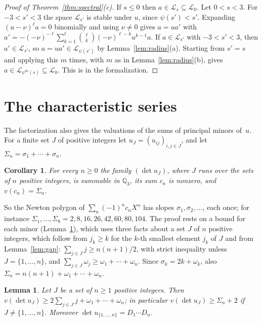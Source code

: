 \documentclass[11pt]{amsart}
\newtheorem{lemma}[theorem]{Lemma}
\newtheorem{corollary}[theorem]{Corollary}
\theoremstyle{definition}
\numberwithin{equation}{section}
\newcommand{\lean}[1]{\ignorespaces}
\newcommand{\Qp}{\mathbb{Q}_3}
\newcommand{\cL}{\mathcal{L}}
\newcommand{\Lc}{\mathcal{L}_0}
\newcommand{\sig}{\sigma}
\begin{document}
\begin{proof}[Proof of Theorem~\textup{\ref{thm:spectral}(c)}]
If $s\le0$ then $a\in\cL_s\subseteq\Lc$. Let $0<s<3$. For $-3<s'<3$ the space $\cL_{s'}$ is stable under $u$, since $\psi(s')<s'$. Expanding $(u-\nu)^\ell a=0$ binomially and using $\nu\ne0$ gives $a=ua'$ with $a'=-(-\nu)^{-\ell}\sum_{k=1}^{\ell}\binom{\ell}{k}(-\nu)^{\ell-k}u^{k-1}a$. If $a\in\cL_{s'}$ with $-3<s'<3$, then $a'\in\cL_{s'}$, so $a=ua'\in\cL_{\psi(s')}$ by Lemma~\ref{lem:radius}(a). Starting from $s'=s$ and applying this $m$ times, with $m$ as in Lemma~\ref{lem:radius}(b), gives $a\in\cL_{\psi^m(s)}\subseteq\Lc$. This is  in the formalization.
\end{proof}

\section{The characteristic series}\label{sec:fredholm}

The factorization also gives the valuations of the sums of principal minors of~$u$. For a finite set $J$ of positive integers let $u_J=(u_{ij})_{i,j\in J}$, and let $\Sigma_n=\sig_1+\cdots+\sig_n$.

\begin{corollary}\label{cor:fredholm}\lean{CalegariSlopes.Newton.calegari_conjecture, CalegariSlopes.Newton.newton}
For every $n\ge0$ the family $(\det u_J)$, where $J$ runs over the sets of $n$ positive integers, is summable in $\Qp$, its sum $c_n$ is nonzero, and $v(c_n)=\Sigma_n$.
\end{corollary}

So the Newton polygon of $\sum_n(-1)^nc_nX^n$ has slopes $\sig_1,\sig_2,\ldots$, each once; for instance $\Sigma_1,\ldots,\Sigma_8=2,8,16,26,42,60,80,104$. The proof rests on a bound for each minor (Lemma~\ref{lem:minor}), which uses three facts about a set $J$ of $n$ positive integers, which follow from $j_k\ge k$ for the $k$-th smallest element $j_k$ of $J$ and from Lemma~\ref{lem:gap}: $\sum_{j\in J}j\ge n(n+1)/2$, with strict inequality unless $J=\{1,\ldots,n\}$, and $\sum_{j\in J}\omega_j\ge\omega_1+\cdots+\omega_n$. Since $\sig_k=2k+\omega_k$, also $\Sigma_n=n(n+1)+\omega_1+\cdots+\omega_n$.

\begin{lemma}\label{lem:minor}\lean{CalegariSlopes.Newton.norm_principalMinor_le_of_ne, CalegariSlopes.Newton.minor_factor, CalegariSlopes.Newton.norm_principalMinor_le, CalegariSlopes.Newton.principalMinor_Ipn}
Let $J$ be a set of $n\ge1$ positive integers. Then $v(\det u_J)\ge2\sum_{j\in J}j+\omega_1+\cdots+\omega_n$; in particular $v(\det u_J)\ge\Sigma_n+2$ if $J\ne\{1,\ldots,n\}$. Moreover $\det u_{\{1,\ldots,n\}}=D_1\cdots D_n$.
\end{lemma}
\end{document}
